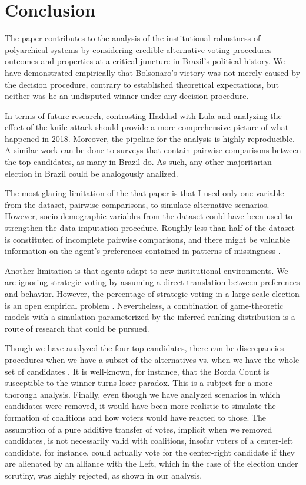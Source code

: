 \documentclass[hidelinks,11pt]{article}
\begin{document}
\section{Conclusion}

The paper contributes to the analysis of the institutional robustness of
polyarchical systems by considering credible alternative voting procedures
outcomes and properties at a critical juncture in Brazil's political history. We
have demonstrated empirically that Bolsonaro's victory was not merely caused by
the decision procedure, contrary to established theoretical expectations, but
neither was he an undisputed winner under any decision procedure.

In terms of future research, contrasting Haddad with Lula and analyzing the
effect of the knife attack should provide a more comprehensive picture of what
happened in 2018. Moreover, the pipeline for the analysis is highly
reproducible. A similar work can be done to surveys that contain pairwise
comparisons between the top candidates, as many in Brazil do. As such, any other
majoritarian election in Brazil could be analogously analized.

The most glaring limitation of the that paper is that I used only one variable
from the dataset, pairwise comparisons, to simulate alternative scenarios.
However, socio-demographic variables from the dataset could have been used to
strengthen the data imputation procedure. Roughly less than half of the dataset
is constituted of incomplete pairwise comparisons, and there might be valuable
information on the agent's preferences contained in patterns of missingness
\parencite{mcelreath2020statistical}.

Another limitation is that agents adapt to new institutional environments. We
are ignoring strategic voting by assuming a direct translation between
preferences and behavior. However, the percentage of strategic voting in a
large-scale election is an open empirical problem
\parencite{straeten10_strat_sincer_heuris_votin_under,kawai2013inferring}.
Nevertheless, a combination of game-theoretic models with a simulation
parameterized by the inferred ranking distribution is a route of research that
could be pursued.

Though we have analyzed the four top candidates, there can be discrepancies
procedures when we have a subset of the alternatives vs. when we have the whole
set of candidates \parencite{saari2001chaotic}. It is well-known, for instance,
that the Borda Count is susceptible to the winner-turns-loser paradox. This is a
subject for a more thorough analysis. Finally, even though we have analyzed
scenarios in which candidates were removed, it would have been more realistic to
simulate the formation of coalitions and how voters would have reacted to those.
The assumption of a pure additive transfer of votes, implicit when we removed
candidates, is not necessarily valid with coalitions, insofar voters of a
center-left candidate, for instance, could actually vote for the center-right
candidate if they are alienated by an alliance with the Left, which in the case
of the election under scrutiny, was highly rejected, as shown in our analysis.
\printbibliography
\end{document}
